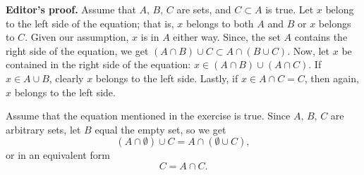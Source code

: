 \textbf{Editor's proof.} Assume that $A, \, B, \, C$ are sets, and $C \subset A$ is true. Let $x$ belong to the left side of the equation; that is, $x$ belongs to both $A$ and $B$ or $x$ belongs to $C$. Given our assumption, $x$ is in $A$ either way. Since, the set $A$ contains the right side of the equation, we get $(A \cap B) \cup C \subset A \cap (B \cup C)$. Now, let $x$ be contained in the right side of the equation: $x \in (A \cap B) \cup (A \cap C)$. If $x \in A \cup B$, clearly $x$ belongs to the left side. Lastly, if $x \in A \cap C = C$, then again, $x$ belongs to the left side.

Assume that the equation mentioned in the exercise is true. Since $A, \, B, \, C$ are arbitrary sets, let $B$ equal the empty set, so we get
\[
	(A \cap \emptyset) \cup C = A \cap (\emptyset \cup C),
\]
or in an equivalent form
\[
	C = A \cap C.
\]